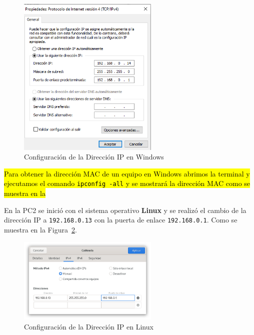         \begin{figure}[H]
            \centering
            \includegraphics[width=0.6\textwidth]{img/cambiar_IP_Windows.png}
            \caption{Configuración de la Dirección IP en Windows}
            \label{fig:ip_windows}
        \end{figure}

        \hl{Para obtener la dirección MAC de un equipo en Windows abrimos la terminal y ejecutamos el comando \texttt{ipconfig -all} y se mostrará la dirección MAC como se muestra en la }


        En la PC2 se inició con el sistema operativo \textbf{Linux} y se realizó el cambio de la dirección IP a \texttt{192.168.0.13} con la puerta de enlace \texttt{192.168.0.1}. Como se muestra en la Figura~\ref{fig:ip_linux}.

        \begin{figure}[H]
            \centering
            \includegraphics[width=0.6\textwidth]{img/cambiar_IP_Linux.png}
            \caption{Configuración de la Dirección IP en Linux}
            \label{fig:ip_linux}
        \end{figure}

